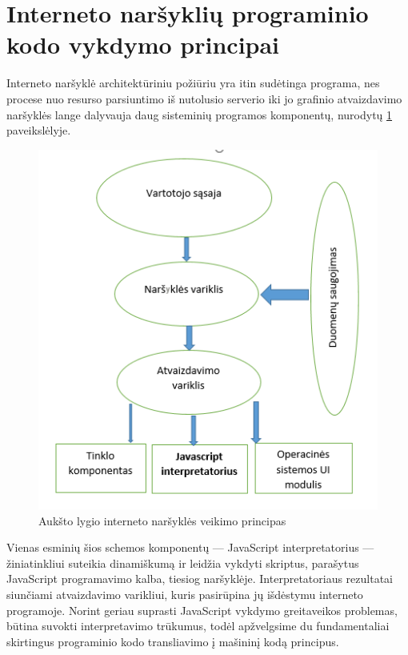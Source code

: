 \documentclass{VUMIFPSkursinis}
\begin{document}
\section{Interneto naršyklių programinio kodo vykdymo principai}
Interneto naršyklė architektūriniu požiūriu yra itin sudėtinga programa, nes procese nuo resurso parsiuntimo iš nutolusio serverio iki jo grafinio atvaizdavimo naršyklės lange dalyvauja daug sisteminių programos komponentų, nurodytų \ref{fig:browser_architecture} paveikslėlyje. 

\begin{figure}[h!]
  \begin{center}
  \includegraphics[scale=0.8]{naršyklės_architektūra.png}
  \end{center}
  \caption{Aukšto lygio interneto naršyklės veikimo principas \cite{Rag17}}
  \label{fig:browser_architecture}
\end{figure}

Vienas esminių šios schemos komponentų — JavaScript interpretatorius — žiniatinkliui suteikia dinamiškumą ir leidžia vykdyti skriptus, parašytus JavaScript programavimo kalba, tiesiog naršyklėje. Interpretatoriaus rezultatai siunčiami atvaizdavimo varikliui, kuris pasirūpina jų išdėstymu interneto programoje. \cite{Rag17} Norint geriau suprasti JavaScript vykdymo greitaveikos problemas, būtina suvokti interpretavimo trūkumus, todėl apžvelgsime du fundamentaliai skirtingus programinio kodo transliavimo į mašininį kodą principus.
\end{document}
